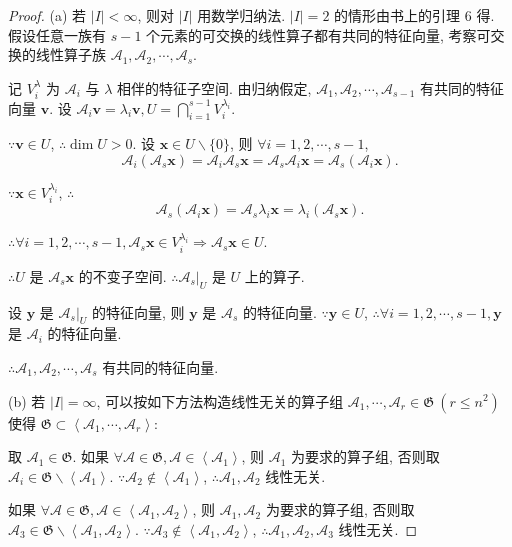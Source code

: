 \documentclass{ctexart}
\begin{document}
\begin{proof}
    (a) 若 $|I|<\infty$, 则对 $|I|$ 用数学归纳法. $|I|=2$ 的情形由书上的引理 6 得. 假设任意一族有 $s-1$ 个元素的可交换的线性算子都有共同的特征向量, 考察可交换的线性算子族 $\mathcal{A}_1,\mathcal{A}_2,\cdots,\mathcal{A}_s$.

    记 $V^\lambda_i$ 为 $\mathcal{A}_i$ 与 $\lambda$ 相伴的特征子空间. 由归纳假定, $\mathcal{A}_1,\mathcal{A}_2,\cdots,\mathcal{A}_{s-1}$ 有共同的特征向量 $\boldsymbol{v}$. 设 $\mathcal{A}_i\boldsymbol{v}=\lambda_i\boldsymbol{v},U=\bigcap\limits_{i=1}^{s-1}V^{\lambda_i}_i$.
    
    $\because\boldsymbol{v}\in U$, $\therefore\dim U>0$. 设 $\boldsymbol{x}\in U\backslash\{0\}$, 则 $\forall i=1,2,\cdots,s-1$,
    \[\mathcal{A}_i(\mathcal{A}_s\boldsymbol{x})=\mathcal{A}_i\mathcal{A}_s\boldsymbol{x}=\mathcal{A}_s\mathcal{A}_i\boldsymbol{x}=\mathcal{A}_s(\mathcal{A}_i\boldsymbol{x}).\]
    
    $\because\boldsymbol{x}\in V^{\lambda_i}_i$, $\therefore$
    \[\mathcal{A}_s(\mathcal{A}_i\boldsymbol{x})=\mathcal{A}_s\lambda_i\boldsymbol{x}=\lambda_i(\mathcal{A}_s\boldsymbol{x}).\]

    $\therefore\forall i=1,2,\cdots,s-1,\mathcal{A}_s\boldsymbol{x}\in V^{\lambda_i}_i\Rightarrow\mathcal{A}_s\boldsymbol{x}\in U$.

    $\therefore U$ 是 $\mathcal{A}_s\boldsymbol{x}$ 的不变子空间. $\therefore\mathcal{A}_s|_U$ 是 $U$ 上的算子.

    设 $\boldsymbol{y}$ 是 $\mathcal{A}_s|_U$ 的特征向量, 则 $\boldsymbol{y}$ 是 $\mathcal{A}_s$ 的特征向量. $\because\boldsymbol{y}\in U$, $\therefore\forall i=1,2,\cdots,s-1,\boldsymbol{y}$ 是 $\mathcal{A}_i$ 的特征向量.

    $\therefore\mathcal{A}_1,\mathcal{A}_2,\cdots,\mathcal{A}_s$ 有共同的特征向量.

    (b) 若 $|I|=\infty$, 可以按如下方法构造线性无关的算子组 $\mathcal{A}_1,\cdots,\mathcal{A}_r\in\mathfrak{G}\ (r\leq n^2)$ 使得 $\mathfrak{G}\subset\left<\mathcal{A}_1,\cdots,\mathcal{A}_r\right>$:

    取 $\mathcal{A}_1\in\mathfrak{G}$. 如果 $\forall\mathcal{A}\in\mathfrak{G},\mathcal{A}\in\left<\mathcal{A}_1\right>$, 则 $\mathcal{A}_1$ 为要求的算子组, 否则取 $\mathcal{A}_i\in\mathfrak{G}\backslash\left<\mathcal{A}_1\right>$. $\because\mathcal{A}_2\notin\left<\mathcal{A}_1\right>$, $\therefore\mathcal{A}_1,\mathcal{A}_2$ 线性无关.
    
    如果 $\forall\mathcal{A}\in\mathfrak{G},\mathcal{A}\in\left<\mathcal{A}_1,\mathcal{A}_2\right>$, 则 $\mathcal{A}_1,\mathcal{A}_2$ 为要求的算子组, 否则取 $\mathcal{A}_3\in\mathfrak{G}\backslash\left<\mathcal{A}_1,\mathcal{A}_2\right>$. $\because\mathcal{A}_3\notin\left<\mathcal{A}_1,\mathcal{A}_2\right>$, $\therefore\mathcal{A}_1,\mathcal{A}_2,\mathcal{A}_3$ 线性无关.
    

\end{proof}
\end{document}

